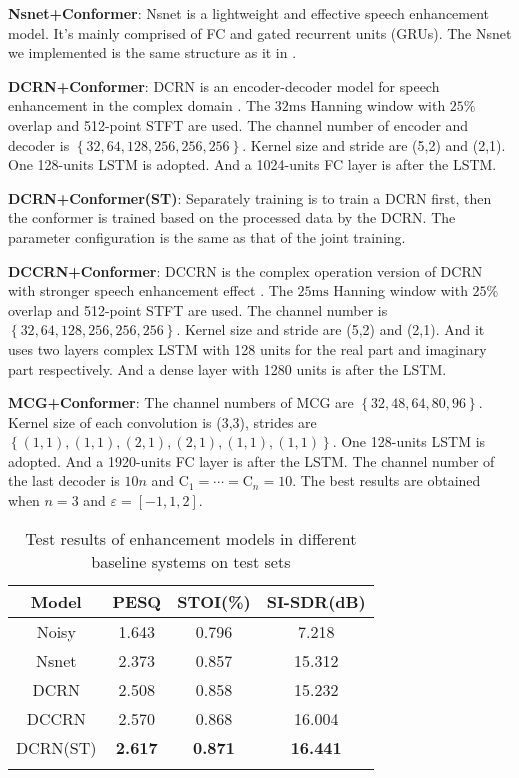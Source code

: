 \documentclass{article}
\begin{document}
	\textbf{Nsnet+Conformer}: Nsnet is a lightweight and effective speech enhancement model. It's mainly comprised of FC and gated recurrent units (GRUs). The Nsnet we implemented is the same structure as it in \cite{Nsnet}. 
	
	\textbf{DCRN+Conformer}: DCRN is an encoder-decoder model for speech enhancement in the complex domain \cite{crn}. The $32\text{ms}$ Hanning window with $25\%$ overlap and 512-point STFT are used. The channel number of encoder and decoder is $\left\{32,64,128,256,256,256\right\}$. Kernel size and stride are (5,2) and (2,1). One 128-units LSTM is adopted. And a 1024-units FC layer is after the LSTM.
	
	\textbf{DCRN+Conformer(ST)}: Separately training is to train a DCRN first, then the conformer is trained based on the processed data by the DCRN. The parameter configuration is the same as that of the joint training.
	
	\textbf{DCCRN+Conformer}: DCCRN is the complex operation version of DCRN with stronger speech enhancement effect \cite{dccrn}. The $25\text{ms}$ Hanning window with $25\%$ overlap and 512-point STFT are used. The channel number is $\left\{32,64,128,256,256,256\right\}$. Kernel size and stride are (5,2) and (2,1). And it uses two layers complex LSTM with 128 units for the real part and imaginary part respectively. And a dense layer with 1280 units is after the LSTM.
	
	\textbf{MCG+Conformer}: The channel numbers of MCG are $\left\{32,48,64,80,96\right\}$. Kernel size of each convolution is (3,3), strides are $\left\{(1,1),(1,1),(2,1),(2,1),(1,1),(1,1)\right\}$. One 128-units LSTM is adopted. And a 1920-units FC layer is after the LSTM. The channel number of the last decoder is $10n$ and $\text{C}_1=\cdots=\text{C}_n=10$. The best results are obtained when $n=3$ and $\varepsilon=\left[-1,1,2\right]$.
	
	\begin{table}[htp]
		\centering
		\vspace{-0.4cm}
		\caption{Test results of enhancement models in different baseline systems on test sets}
		\begin{tabular}{cccc}
			\toprule
			Model &  PESQ & STOI(\%)  & SI-SDR(dB) \\ 
			\midrule
			Noisy  & 1.643 & 0.796 &  7.218 \\	
			Nsnet   & 2.373  & 0.857   &  15.312   \\
			DCRN   & 2.508  & 0.858   &  15.232   \\
			DCCRN  & 2.570 & 0.868  & 16.004  \\
			DCRN(ST)   & \textbf{2.617}  & \textbf{0.871}   &  \textbf{16.441}   \\
			\bottomrule
			\label{results}
		\end{tabular}
		\label{tab:2}
		\vspace{-0.6cm}
	\end{table}
\end{document}
